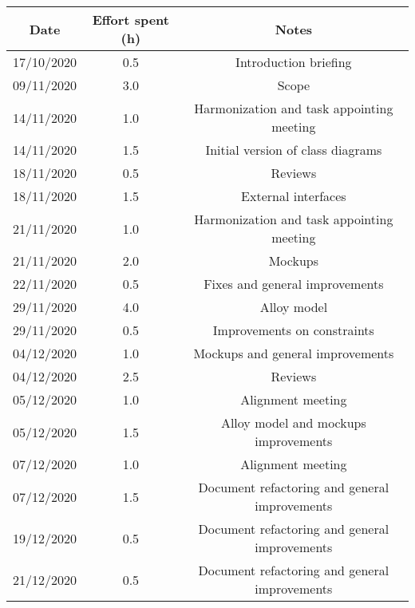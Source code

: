 \documentclass[../../main.tex]{subfiles}
\begin{document}
\begin{center}
    \begin{tabular}{|c| |c| |c|} 
        \hline
        Date & Effort spent (h) & Notes\\ [0.5ex] 
        \hline\hline
        17/10/2020 & 0.5 & Introduction briefing\\ 
        09/11/2020 & 3.0 & Scope\\ 
        14/11/2020 & 1.0 & Harmonization and task appointing meeting\\
        14/11/2020 & 1.5 & Initial version of class diagrams\\
        18/11/2020 & 0.5 & Reviews\\
        18/11/2020 & 1.5 & External interfaces\\
        21/11/2020 & 1.0 & Harmonization and task appointing meeting\\
        21/11/2020 & 2.0 & Mockups\\
        22/11/2020 & 0.5 & Fixes and general improvements\\
        29/11/2020 & 4.0 & Alloy model\\
        29/11/2020 & 0.5 & Improvements on constraints\\
        04/12/2020 & 1.0 & Mockups and general improvements\\
        04/12/2020 & 2.5 & Reviews\\
        05/12/2020 & 1.0 & Alignment meeting\\
        05/12/2020 & 1.5 & Alloy model and mockups improvements\\
        07/12/2020 & 1.0 & Alignment meeting\\
        07/12/2020 & 1.5 & Document refactoring and general improvements\\
        19/12/2020 & 0.5 & Document refactoring and general improvements\\
        21/12/2020 & 0.5 & Document refactoring and general improvements\\
        \hline
    \end{tabular}
\end{center}
\end{document}
